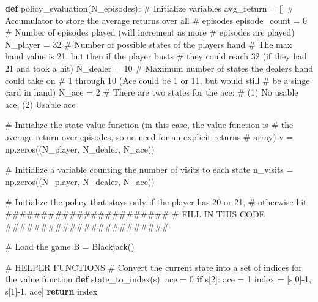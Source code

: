 \documentclass[
  letterpaper,
  DIV=11,
  numbers=noendperiod]{scrartcl}
\newenvironment{Shaded}{\begin{snugshade}}{\end{snugshade}}
\newcommand{\CommentTok}[1]{\textcolor[rgb]{0.37,0.37,0.37}{#1}}
\newcommand{\ControlFlowTok}[1]{\textcolor[rgb]{0.00,0.23,0.31}{\textbf{#1}}}
\newcommand{\DecValTok}[1]{\textcolor[rgb]{0.68,0.00,0.00}{#1}}
\newcommand{\KeywordTok}[1]{\textcolor[rgb]{0.00,0.23,0.31}{\textbf{#1}}}
\newcommand{\NormalTok}[1]{\textcolor[rgb]{0.00,0.23,0.31}{#1}}
\newcommand{\OperatorTok}[1]{\textcolor[rgb]{0.37,0.37,0.37}{#1}}
\begin{document}
\begin{Shaded}
\begin{Highlighting}[]
\KeywordTok{def}\NormalTok{ policy\_evaluation(N\_episodes):}
    \CommentTok{\# Initialize variables}
\NormalTok{    avg\_return }\OperatorTok{=}\NormalTok{ []    }\CommentTok{\# Accumulator to store the average returns over all }
                       \CommentTok{\#  episodes}
\NormalTok{    episode\_count }\OperatorTok{=} \DecValTok{0}  \CommentTok{\# Number of episodes played (will increment as more }
                       \CommentTok{\#  episodes are played)}
\NormalTok{    N\_player   }\OperatorTok{=} \DecValTok{32}    \CommentTok{\# Number of possible states of the players hand}
                       \CommentTok{\#  The max hand value is 21, but then if the player busts }
                       \CommentTok{\#  they could reach 32 (if they had 21 and took a hit)}
\NormalTok{    N\_dealer   }\OperatorTok{=} \DecValTok{10}    \CommentTok{\# Maximum number of states the dealer\textquotesingle{}s hand could take on}
                       \CommentTok{\#  1 through 10 (Ace could be 1 or 11, but would still }
                       \CommentTok{\#  be a singe card in hand)}
\NormalTok{    N\_ace      }\OperatorTok{=} \DecValTok{2}     \CommentTok{\# There are two states for the ace: }
                       \CommentTok{\#  (1) No usable ace, (2) Usable ace}
    
    \CommentTok{\# Initialize the state value function (in this case, the value function is  }
    \CommentTok{\#   the average return over episodes, so no need for an explicit returns }
    \CommentTok{\#   array)}
\NormalTok{    v }\OperatorTok{=}\NormalTok{ np.zeros((N\_player, N\_dealer, N\_ace)) }
    
    \CommentTok{\# Initialize a variable counting the number of visits to each state}
\NormalTok{    n\_visits }\OperatorTok{=}\NormalTok{ np.zeros((N\_player, N\_dealer, N\_ace))}
    
    \CommentTok{\# Initialize the policy that stays only if the player has 20 or 21, }
    \CommentTok{\#  otherwise hit}
    \CommentTok{\#\#\#\#\#\#\#\#\#\#\#\#\#\#\#\#\#\#\#\#\#\#\#}
    \CommentTok{\# FILL IN THIS CODE}
    \CommentTok{\#\#\#\#\#\#\#\#\#\#\#\#\#\#\#\#\#\#\#\#\#\#\#}
    
    \CommentTok{\# Load the game}
\NormalTok{    B }\OperatorTok{=}\NormalTok{ Blackjack()}
    
    \CommentTok{\# HELPER FUNCTIONS}
    \CommentTok{\# Convert the current state into a set of indices for the value function}
    \KeywordTok{def}\NormalTok{ state\_to\_index(s):}
\NormalTok{        ace }\OperatorTok{=} \DecValTok{0}
        \ControlFlowTok{if}\NormalTok{ s[}\DecValTok{2}\NormalTok{]:}
\NormalTok{            ace }\OperatorTok{=} \DecValTok{1}
\NormalTok{        index }\OperatorTok{=}\NormalTok{ [s[}\DecValTok{0}\NormalTok{]}\OperatorTok{{-}}\DecValTok{1}\NormalTok{, s[}\DecValTok{1}\NormalTok{]}\OperatorTok{{-}}\DecValTok{1}\NormalTok{, ace]}
        \ControlFlowTok{return}\NormalTok{ index}
    

\end{Highlighting}
\end{Shaded}
\end{document}
